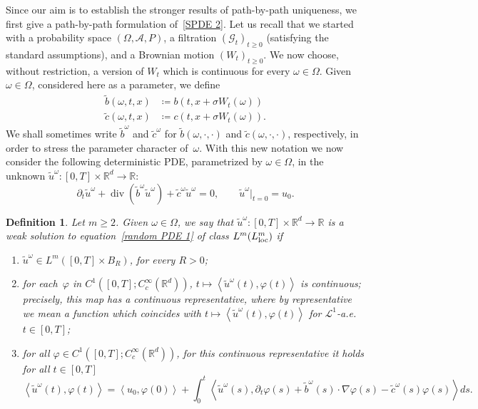 \documentclass[a4paper,10pt]{article}
\newtheorem{definition}[theorem]{Definition}
\newcommand\1{\mathbbm{1}}
\newcommand{\mc}{\mathcal}
\newcommand\loc{{\rm loc}}
\DeclareMathOperator{\diverg}{div}
\numberwithin{equation}{section}
\begin{document}
Since our aim is to establish the stronger results of path-by-path uniqueness, we first give a path-by-path formulation of~\eqref{SPDE 2}. Let us recall that we started with a probability space $(\Omega,\mathcal{A},P)$, a filtration $(\mathcal{G}_{t})_{t\geq0}$ (satisfying the standard assumptions), and a Brownian motion $(W_{t})_{t\geq0}$. We now choose, without restriction, a version of $W_{t}$ which is continuous for every $\omega\in\Omega$. Given $\omega\in\Omega$, considered here as a parameter, we define
\begin{align*}
\widetilde{b}(\omega,t,x) &  \coloneqq b(t,x+\sigma W_{t}(\omega)) \\
\widetilde{c}(\omega,t,x) &  \coloneqq c(t,x+\sigma W_{t}(\omega)) .
\end{align*}
We shall sometimes write $\widetilde{b}^{\omega}$ and $\widetilde{c}^{\omega}$ for $\widetilde{b}(\omega,\cdot,\cdot)$ and $\widetilde{c}(\omega,\cdot,\cdot)$, respectively, in order to stress the parameter character of~$\omega$. With this new notation we now consider the following deterministic PDE, parametrized by $\omega\in\Omega$, in the unknown $\widetilde{u}^{\omega} \colon [0,T]\times\mathbb{R}^{d}\rightarrow\mathbb{R}$:
\begin{equation}
\partial_t \widetilde{u}^{\omega} + \diverg (\widetilde{b}^{\omega}\widetilde{u}^{\omega})  +\widetilde{c}^{\omega}\widetilde{u}^{\omega}=0,\qquad\widetilde{u}^{\omega}|_{t=0}=u_{0}.  
\label{random PDE 1}
\end{equation}

\begin{definition}
\label{Def weak sol random PDE}
Let $m\geq2$. Given $\omega\in\Omega$, we say that $\widetilde{u}^{\omega} \colon [0,T] \times\mathbb{R}^{d}\rightarrow\mathbb{R}$ is a \emph{weak solution to equation~\eqref{random PDE 1} of class $L^{m}(L^{m}_\loc)$} if 
\begin{enumerate}[font=\normalfont, label=(\roman{*}), ref=(\roman{*})]
 \item $\widetilde{u}^{\omega}\in L^{m}([0,T] \times B_{R})$, for every $R>0$;  \label{rand_Def_1}
 \item for each~$\varphi$ in $C^1([0,T];C_{c}^{\infty}(\mathbb{R}^{d}))$, $t\mapsto\left\langle \widetilde{u}^{\omega}(t),\varphi(t)\right\rangle $ is continuous; precisely, this map has a continuous representative, where by representative we mean a function which coincides with $t\mapsto\left\langle \widetilde{u}^{\omega}(t),\varphi(t)\right\rangle $ for $\mc{L}^1$-a.e.~$t\in [0,T]$;
 \item for all $\varphi\in C^1([0,T];C_{c}^{\infty}(\mathbb{R}^{d}))$, for this continuous representative it holds for all $t \in [0,T]$
 \begin{equation}\label{formulation_randomPDE}
 \left\langle \widetilde{u}^{\omega}(t)  ,\varphi(t)\right\rangle =\left\langle u_{0},\varphi(0)\right\rangle +\int^t_0\left\langle \widetilde{u}^\omega(s),\partial_t\varphi(s) + \widetilde{b}^{\omega}(s)  \cdot\nabla\varphi(s)-\widetilde{c}^{\omega}(s)  \varphi(s) \right\rangle ds .
 \end{equation}
\end{enumerate}
\end{definition}
\end{document}

